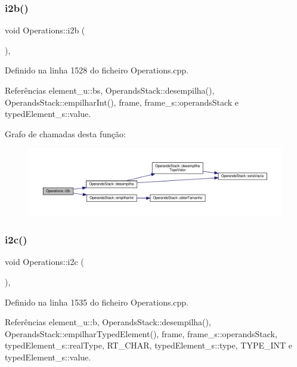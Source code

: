 \subsubsection{\texorpdfstring{i2b()}{i2b()}}
{\footnotesize\ttfamily void Operations\+::i2b (\begin{DoxyParamCaption}{ }\end{DoxyParamCaption})\hspace{0.3cm}{\ttfamily [static]}, {\ttfamily [private]}}



Definido na linha 1528 do ficheiro Operations.\+cpp.



Referências element\+\_\+u\+::bs, Operands\+Stack\+::desempilha(), Operands\+Stack\+::empilhar\+Int(), frame, frame\+\_\+s\+::operands\+Stack e typed\+Element\+\_\+s\+::value.

Grafo de chamadas desta função\+:\nopagebreak
\begin{figure}[H]
\begin{center}
\leavevmode
\includegraphics[width=350pt]{classOperations_adfe0344bae5a1252330b7324e827ed35_cgraph}
\end{center}
\end{figure}
\mbox{\label{classOperations_a43b01132bf9acf598d0ced8719c194c7}} 
\subsubsection{\texorpdfstring{i2c()}{i2c()}}
{\footnotesize\ttfamily void Operations\+::i2c (\begin{DoxyParamCaption}{ }\end{DoxyParamCaption})\hspace{0.3cm}{\ttfamily [static]}, {\ttfamily [private]}}



Definido na linha 1535 do ficheiro Operations.\+cpp.



Referências element\+\_\+u\+::b, Operands\+Stack\+::desempilha(), Operands\+Stack\+::empilhar\+Typed\+Element(), frame, frame\+\_\+s\+::operands\+Stack, typed\+Element\+\_\+s\+::real\+Type, R\+T\+\_\+\+C\+H\+AR, typed\+Element\+\_\+s\+::type, T\+Y\+P\+E\+\_\+\+I\+NT e typed\+Element\+\_\+s\+::value.

